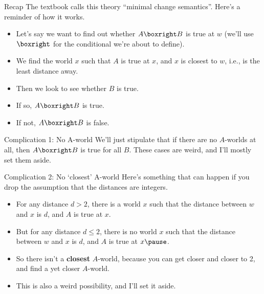 \documentclass[
  ignorenonframetext,
]{beamer}
\providecommand{\tightlist}{%
  \setlength{\itemsep}{0pt}\setlength{\parskip}{0pt}}
\renewcommand{\,}{\text{, }}
\begin{document}
\begin{frame}{Recap}
\protect\hypertarget{recap}{}
The textbook calls this theory ``minimal change semantics''. Here's a
reminder of how it works.

\begin{itemize}
\tightlist
\item
  Let's say we want to find out whether \(A \boxright B\) is true at
  \(w\) (we'll use \(\boxright\) for the conditional we're about to
  define).
\item
  We find the world \(x\) such that \(A\) is true at \(x\), and \(x\) is
  closest to \(w\), i.e., is the least distance away.
\item
  Then we look to see whether \(B\) is true.
\item
  If so, \(A \boxright B\) is true.
\item
  If not, \(A \boxright B\) is false.
\end{itemize}
\end{frame}

\begin{frame}{Complication 1: No A-world}
\protect\hypertarget{complication-1-no-a-world}{}
We'll just stipulate that if there are no \(A\)-worlds at all, then
\(A \boxright B\) is true for all \(B\). These cases are weird, and I'll
mostly set them aside.
\end{frame}

\begin{frame}{Complication 2: No `closest' A-world}
\protect\hypertarget{complication-2-no-closest-a-world}{}
Here's something that can happen if you drop the assumption that the
distances are integers.

\begin{itemize}
\tightlist
\item
  For any distance \(d > 2\), there is a world \(x\) such that the
  distance between \(w\) and \(x\) is \(d\), and \(A\) is true at \(x\).
\item
  But for any distance \(d \leq 2\), there is no world \(x\) such that
  the distance between \(w\) and \(x\) is \(d\), and \(A\) is true at
  \(x \pause\).
\item
  So there isn't a \textbf{closest} \(A\)-world, because you can get
  closer and closer to 2, and find a yet closer \(A\)-world.
\item
  This is also a weird possibility, and I'll set it aside.
\end{itemize}
\end{frame}
\end{document}
